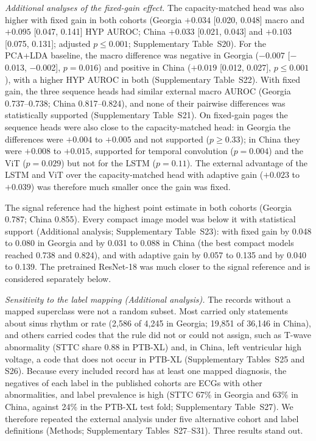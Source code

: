 \documentclass{wlscirep}
\begin{document}
\emph{Additional analyses of the fixed-gain effect.} The capacity-matched head was also higher with fixed gain in both cohorts (Georgia $+0.034$ [0.020, 0.048] macro and $+0.095$ [0.047, 0.141] HYP AUROC; China $+0.033$ [0.021, 0.043] and $+0.103$ [0.075, 0.131]; adjusted $p\le0.001$; Supplementary Table~S20). For the PCA+LDA baseline, the macro difference was negative in Georgia ($-0.007$ [$-$0.013, $-$0.002], $p=0.016$) and positive in China ($+0.019$ [0.012, 0.027], $p\le0.001$), with a higher HYP AUROC in both (Supplementary Table~S22). With fixed gain, the three sequence heads had similar external macro AUROC (Georgia 0.737--0.738; China 0.817--0.824), and none of their pairwise differences was statistically supported (Supplementary Table~S21). On fixed-gain pages the sequence heads were also close to the capacity-matched head: in Georgia the differences were $+0.004$ to $+0.005$ and not supported ($p\ge0.33$); in China they were $+0.008$ to $+0.015$, supported for temporal convolution ($p=0.004$) and the ViT ($p=0.029$) but not for the LSTM ($p=0.11$). The external advantage of the LSTM and ViT over the capacity-matched head with adaptive gain ($+0.023$ to $+0.039$) was therefore much smaller once the gain was fixed.

The signal reference had the highest point estimate in both cohorts (Georgia 0.787; China 0.855). Every compact image model was below it with statistical support (Additional analysis; Supplementary Table~S23): with fixed gain by 0.048 to 0.080 in Georgia and by 0.031 to 0.088 in China (the best compact models reached 0.738 and 0.824), and with adaptive gain by 0.057 to 0.135 and by 0.040 to 0.139. The pretrained ResNet-18 was much closer to the signal reference and is considered separately below.

\emph{Sensitivity to the label mapping (Additional analysis).} The records without a mapped superclass were not a random subset. Most carried only statements about sinus rhythm or rate (2{,}586 of 4{,}245 in Georgia; 19{,}851 of 36{,}146 in China), and others carried codes that the rule did not or could not assign, such as T-wave abnormality (STTC share 0.88 in PTB-XL) and, in China, left ventricular high voltage, a code that does not occur in PTB-XL (Supplementary Tables~S25 and S26). Because every included record has at least one mapped diagnosis, the negatives of each label in the published cohorts are ECGs with other abnormalities, and label prevalence is high (STTC 67\% in Georgia and 63\% in China, against 24\% in the PTB-XL test fold; Supplementary Table~S27). We therefore repeated the external analysis under five alternative cohort and label definitions (Methods; Supplementary Tables~S27--S31). Three results stand out.
\end{document}
